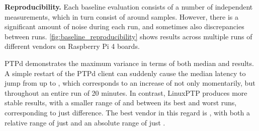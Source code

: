 
{

\renewcommand{\ptpKeyPrefix}{/reproducibility/rpi-4}


\newcommand{\numBaselineMeasurements}{10}
\newcommand{\baselineTotalMinutesRuntime}{\numBaselineMeasurements*4*2*20}
\newcommand{\numSamplesPerRunApprox}{\fpeval{round(20*60)}}

\textbf{Reproducibility.}
Each baseline evaluation consists of a number of independent measurements,
which in turn consist of around \numSamplesPerRunApprox{} samples.
However, there is a significant amount of noise during each run,
and sometimes also discrepancies between runs.
\cref{fig:baseline_reproducibility} shows results across multiple
runs of different vendors on Raspberry Pi 4 boards.

PTPd demonstrates the maximum variance in terms of both median and \PNineFive{} results.
A simple restart of the PTPd client can suddenly cause the median
latency to jump from  up to , which
corresponds to an increase of
 not only momentarily, but
throughout an entire run of 20 minutes.
In contrast, LinuxPTP produces more stable results, with a smaller range
of  and  between its best and worst runs,
corresponding to just  difference.
The best vendor in this regard is \fVendor{\cmpMinArg},
with both a relative range of just \fRelative{\cmpMin} and an absolute range of just
.

}
